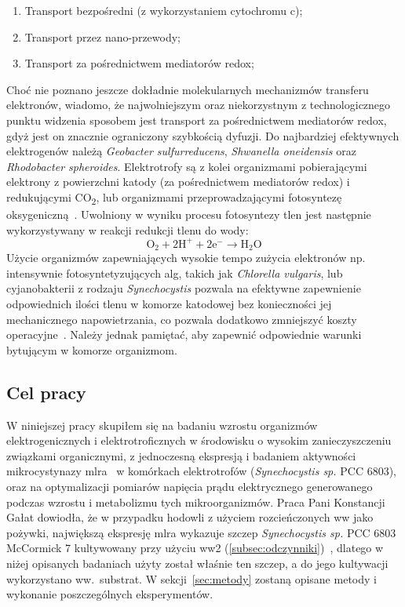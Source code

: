 \begin{enumerate}
    \item Transport bezpośredni (z wykorzystaniem cytochromu c);
    \item Transport przez nano-przewody;
    \item Transport za pośrednictwem mediatorów redox;
\end{enumerate}

Choć nie poznano jeszcze dokładnie molekularnych mechanizmów
transferu elektronów, wiadomo, że najwolniejszym oraz
niekorzystnym z technologicznego punktu widzenia sposobem jest
transport za pośrednictwem mediatorów redox, gdyż jest on znacznie
ograniczony szybkością dyfuzji.
Do najbardziej efektywnych elektrogenów należą
\textit{Geobacter sulfurreducens}, \textit{Shwanella oneidensis}
oraz \textit{Rhodobacter spheroides}.
Elektrotrofy są z kolei organizmami pobierającymi elektrony
z powierzchni katody (za pośrednictwem mediatorów redox)
i redukującymi CO\textsubscript{2}, lub organizmami przeprowadzającymi fotosyntezę
oksygeniczną~\cite{Santoro2017, Reddy2019}.
Uwolniony w wyniku procesu fotosyntezy tlen jest następnie
wykorzystywany w reakcji redukcji tlenu do wody:
\begin{equation}
    \label{eq:2}
    \mathrm{O_2 + 2H^+ + 2e^- \rightarrow H_2 O}
\end{equation}
Użycie organizmów zapewniających wysokie tempo zużycia elektronów np.
intensywnie fotosyntetyzujących alg, takich jak \textit{Chlorella vulgaris},
lub cyjanobakterii z rodzaju \textit{Synechocystis} pozwala na efektywne
zapewnienie odpowiednich ilości tlenu w komorze katodowej bez
konieczności jej mechanicznego napowietrzania, co pozwala dodatkowo
zmniejszyć koszty operacyjne~\cite{Reddy2019}.
Należy jednak pamiętać, aby zapewnić odpowiednie warunki
bytującym w komorze organizmom.

\subsection{Cel pracy}\label{subsec:badania}
W niniejszej pracy skupiłem się na badaniu wzrostu organizmów
elektrogenicznych i elektrotroficznych
w środowisku o wysokim zanieczyszczeniu związkami
organicznymi, z jednoczesną ekspresją i badaniem aktywności mikrocystynazy
\acrshort{mlra}~\cite{Dexter2018, Dexter2021} w komórkach elektrotrofów
(\textit{Synechocystis sp.} PCC 6803),
oraz na optymalizacji pomiarów napięcia prądu elektrycznego generowanego
podczas wzrostu i metabolizmu tych mikroorganizmów.
Praca Pani Konstancji Gałat dowiodła, że w przypadku
hodowli z użyciem rozcieńczonych \acrshort{ww} jako pożywki,
największą ekspresję \acrshort{mlra} wykazuje szczep
\textit{Synechocystis sp.} PCC 6803 McCormick 7 kultywowany przy
użyciu \acrshort{ww}2 (\ref{subsec:odczynniki})~\cite{Galat2022},
dlatego w niżej opisanych badaniach użyty został właśnie ten szczep,
a do jego kultywacji wykorzystano ww.\ substrat.
W sekcji~\ref{sec:metody} zostaną opisane metody i wykonanie
poszczególnych eksperymentów.